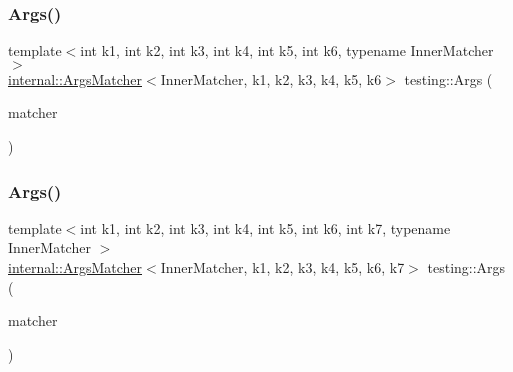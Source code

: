 \mbox{\label{namespacetesting_abc92e87b4a9cad372b082d81479f3d48}} 
\subsubsection{\texorpdfstring{Args()}{Args()}\hspace{0.1cm}{\footnotesize\ttfamily [7/11]}}
{\footnotesize\ttfamily template$<$int k1, int k2, int k3, int k4, int k5, int k6, typename Inner\+Matcher $>$ \\
\mbox{\hyperlink{classtesting_1_1internal_1_1_args_matcher}{internal\+::\+Args\+Matcher}}$<$Inner\+Matcher, k1, k2, k3, k4, k5, k6$>$ testing\+::\+Args (\begin{DoxyParamCaption}\item[{const Inner\+Matcher \&}]{matcher }\end{DoxyParamCaption})\hspace{0.3cm}{\ttfamily [inline]}}

\mbox{\label{namespacetesting_a9a9ef7a866b397430527076e342817f9}} 
\subsubsection{\texorpdfstring{Args()}{Args()}\hspace{0.1cm}{\footnotesize\ttfamily [8/11]}}
{\footnotesize\ttfamily template$<$int k1, int k2, int k3, int k4, int k5, int k6, int k7, typename Inner\+Matcher $>$ \\
\mbox{\hyperlink{classtesting_1_1internal_1_1_args_matcher}{internal\+::\+Args\+Matcher}}$<$Inner\+Matcher, k1, k2, k3, k4, k5, k6, k7$>$ testing\+::\+Args (\begin{DoxyParamCaption}\item[{const Inner\+Matcher \&}]{matcher }\end{DoxyParamCaption})\hspace{0.3cm}{\ttfamily [inline]}}

\mbox{\label{namespacetesting_ae8a4e8e1b8eb87c9f1e5f02519da7fce}} 
